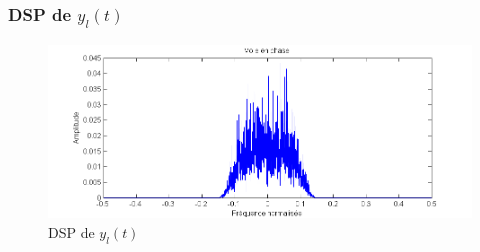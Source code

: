 \documentclass[11pt]{article}
\begin{document}
			
			
		\subsubsection{DSP de $y_l(t)$}
			\begin{figure}[!h]
				\centering
				\includegraphics[scale=0.5]{images/Q4211.png}
				\caption{DSP de $y_l(t)$}
				\label{Q4211}
			\end{figure}
			
			
\end{document}
